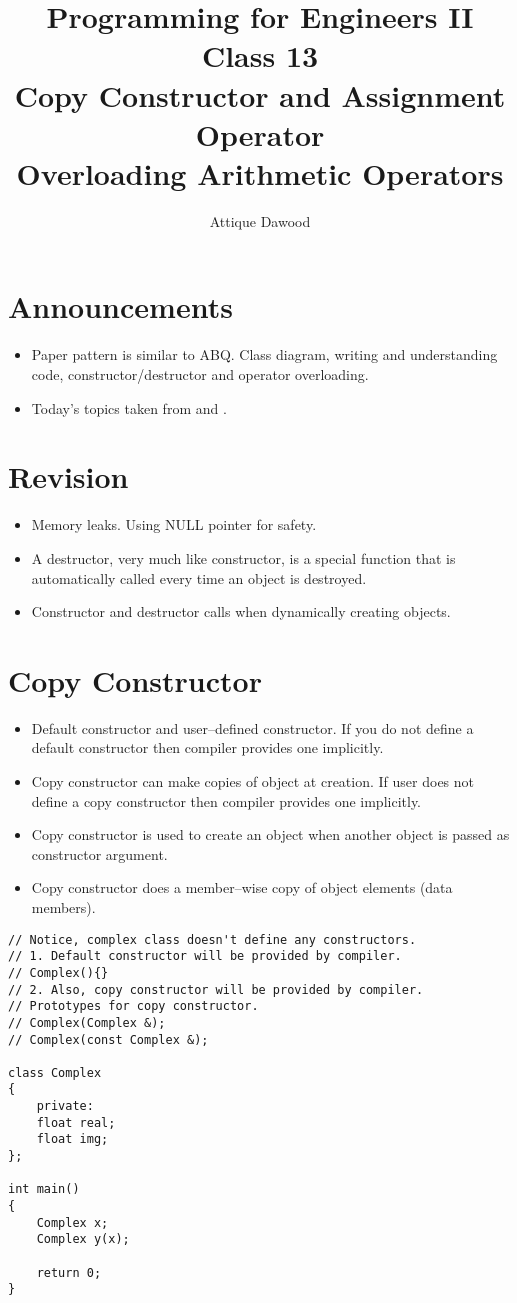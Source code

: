 \documentclass[12pt,a4paper]{article}
\title{\vspace{-2cm}Programming for Engineers II\\Class 13\\Copy Constructor and Assignment Operator\\Overloading Arithmetic Operators}
\author{Attique Dawood}
\begin{document}
\maketitle
\section{Announcements}
\begin{itemize}
\item Paper pattern is similar to ABQ. Class diagram, writing and understanding code, constructor/destructor and operator overloading.
\item Today's topics taken from \cite{Ref:CPP-Copy-Constructor-and-Assignment-Operator} and \cite{Ref:CPP-Operator-Overloading}.
\end{itemize}
\section{Revision}
\begin{itemize}
\item Memory leaks. Using NULL pointer for safety.
\item A destructor, very much like constructor, is a special function that is automatically called every time an object is destroyed.
\item Constructor and destructor calls when dynamically creating objects.
\end{itemize}
\section{Copy Constructor}
\begin{itemize}
\item Default constructor and user--defined constructor. If you do not define a default constructor then compiler provides one implicitly.
\item Copy constructor can make copies of object at creation. If user does not define a copy constructor then compiler provides one implicitly.
\item Copy constructor is used to create an object when another object is passed as constructor argument.
\item Copy constructor does a member--wise copy of object elements (data members).
\end{itemize}
\begin{lstlisting}[caption={Copy Constructor}]
// Notice, complex class doesn't define any constructors.
// 1. Default constructor will be provided by compiler.
// Complex(){}
// 2. Also, copy constructor will be provided by compiler.
// Prototypes for copy constructor.
// Complex(Complex &);
// Complex(const Complex &);

class Complex
{
	private:
	float real;
	float img;
};

int main()
{
	Complex x;
	Complex y(x);
	
	return 0;
}
\end{lstlisting}
\end{document}
